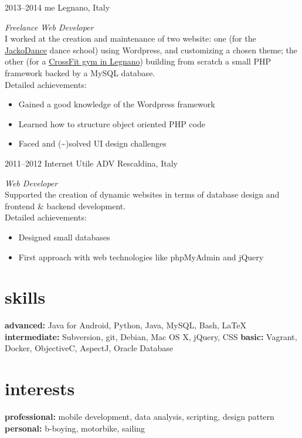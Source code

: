 \documentclass[]{friggeri-cv} %
\begin{document}
\begin{entrylist}


\entry
{2013--2014}
{me}
{Legnano, Italy}
{\emph{Freelance Web Developer} \\
I worked at the creation and maintenance of two website: one (for the \href{http://jackodance.it}{JackoDance} dance school) using Wordpress, and customizing a chosen theme; the other (for a \href{http://crossfitlegnano.com}{CrossFit gym in Legnano}) building from scratch a small PHP framework backed by a MySQL database. \\
Detailed achievements:
\begin{itemize}
  \item Gained a good knowledge of the Wordpress framework
  \item Learned how to structure object oriented PHP code
  \item Faced and (\textasciitilde)solved UI design challenges
\end{itemize}}


\entry
{2011--2012}
{Internet Utile ADV}
{Rescaldina, Italy}
{\emph{Web Developer} \\
Supported the creation of dynamic websites in terms of database design and frontend \& backend development. \\
Detailed achievements:
\begin{itemize}
  \item Designed small databases
  \item First approach with web technologies like phpMyAdmin and jQuery
\end{itemize}}


\end{entrylist}


\section{skills}

\textbf{advanced:} Java for Android, Python, Java, MySQL, Bash, \LaTeX{} \textbf{intermediate:} Subversion, git, Debian, Mac OS X, jQuery, CSS \textbf{basic:} Vagrant, Docker, ObjectiveC, AspectJ, Oracle Database


\section{interests}

\textbf{professional:} mobile development, data analysis, scripting, design pattern \textbf{personal:} b-boying, motorbike, sailing
\end{document}
